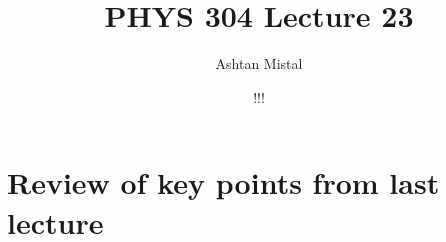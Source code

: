 \documentclass{article}
\title{PHYS 304 Lecture 23}
\author{Ashtan Mistal}
\date{!!!}
\begin{document}
\ifstandalone
\maketitle
\fi

\graphicspath{{./Lecture23/}}

\section{Review of key points from last lecture}

\end{document}
